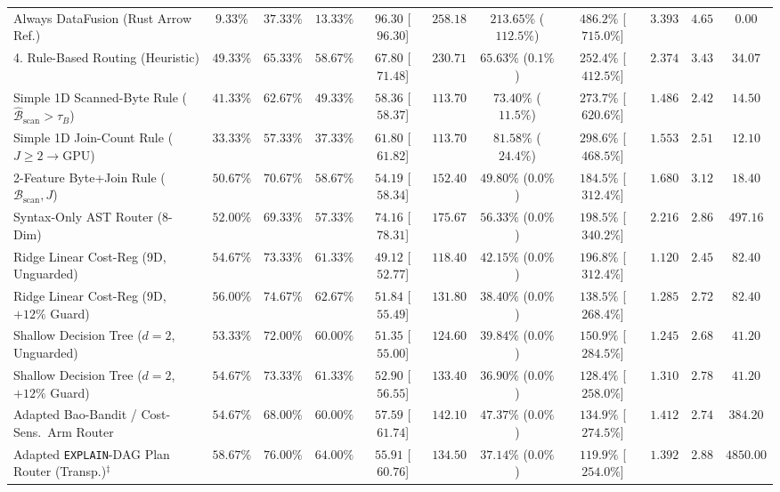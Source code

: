 \documentclass[10pt,a4paper]{article}
\newenvironment{fitasttable}{%
  \begin{lrbox}{\asttblbox}%
}{%
  \end{lrbox}%
  \sbox{\asttblboxB}{%
    \ifdim\wd\asttblbox>0.96\textwidth
      \resizebox{0.96\textwidth}{!}{\usebox{\asttblbox}}%
    \else
      \usebox{\asttblbox}%
    \fi
  }%
  \ifdim\ht\asttblboxB>0.72\textheight
    \resizebox{!}{0.72\textheight}{\usebox{\asttblboxB}}%
  \else
    \usebox{\asttblboxB}%
  \fi
}
\begin{document}
\begin{table}[!htbp]
\begin{fitasttable}
\begin{tabular}{@{}lcccccccccc@{}}
Always DataFusion (Rust Arrow Ref.) & $9.33\%$ & $37.33\%$ & $13.33\%$ & $96.30$ [$96.30$] & $258.18$ & $213.65\%$ ($112.5\%$) & $486.2\%$ [$715.0\%$] & $3.393$ & $4.65$ & $0.00$ \\
4. Rule-Based Routing (Heuristic) & $49.33\%$ & $65.33\%$ & $58.67\%$ & $67.80$ [$71.48$] & $230.71$ & $65.63\%$ ($0.1\%$) & $252.4\%$ [$412.5\%$] & $2.374$ & $3.43$ & $34.07$ \\
Simple 1D Scanned-Byte Rule ($\hat{\mathcal{B}}_{\text{scan}} > \tau_B$) & $41.33\%$ & $62.67\%$ & $49.33\%$ & $58.36$ [$58.37$] & $113.70$ & $73.40\%$ ($11.5\%$) & $273.7\%$ [$620.6\%$] & $1.486$ & $2.42$ & $14.50$ \\
Simple 1D Join-Count Rule ($J \ge 2 \rightarrow \text{GPU}$) & $33.33\%$ & $57.33\%$ & $37.33\%$ & $61.80$ [$61.82$] & $113.70$ & $81.58\%$ ($24.4\%$) & $298.6\%$ [$468.5\%$] & $1.553$ & $2.51$ & $12.10$ \\
2-Feature Byte+Join Rule ($\mathcal{B}_{\text{scan}}, J$) & $50.67\%$ & $70.67\%$ & $58.67\%$ & $54.19$ [$58.34$] & $152.40$ & $49.80\%$ ($0.0\%$) & $184.5\%$ [$312.4\%$] & $1.680$ & $3.12$ & $18.40$ \\
Syntax-Only AST Router (8-Dim) & $52.00\%$ & $69.33\%$ & $57.33\%$ & $74.16$ [$78.31$] & $175.67$ & $56.33\%$ ($0.0\%$) & $198.5\%$ [$340.2\%$] & $2.216$ & $2.86$ & $497.16$ \\
Ridge Linear Cost-Reg (9D, Unguarded) & $54.67\%$ & $73.33\%$ & $61.33\%$ & $49.12$ [$52.77$] & $118.40$ & $42.15\%$ ($0.0\%$) & $196.8\%$ [$312.4\%$] & $1.120$ & $2.45$ & $82.40$ \\
Ridge Linear Cost-Reg (9D, $+12\%$ Guard) & $56.00\%$ & $74.67\%$ & $62.67\%$ & $51.84$ [$55.49$] & $131.80$ & $38.40\%$ ($0.0\%$) & $138.5\%$ [$268.4\%$] & $1.285$ & $2.72$ & $82.40$ \\
Shallow Decision Tree ($d=2$, Unguarded) & $53.33\%$ & $72.00\%$ & $60.00\%$ & $51.35$ [$55.00$] & $124.60$ & $39.84\%$ ($0.0\%$) & $150.9\%$ [$284.5\%$] & $1.245$ & $2.68$ & $41.20$ \\
Shallow Decision Tree ($d=2$, $+12\%$ Guard) & $54.67\%$ & $73.33\%$ & $61.33\%$ & $52.90$ [$56.55$] & $133.40$ & $36.90\%$ ($0.0\%$) & $128.4\%$ [$258.0\%$] & $1.310$ & $2.78$ & $41.20$ \\
Adapted Bao-Bandit / Cost-Sens.\ Arm Router & $54.67\%$ & $68.00\%$ & $60.00\%$ & $57.59$ [$61.74$] & $142.10$ & $47.37\%$ ($0.0\%$) & $134.9\%$ [$274.5\%$] & $1.412$ & $2.74$ & $384.20$ \\
Adapted \texttt{EXPLAIN}-DAG Plan Router (Transp.)$^{\ddagger}$ & $58.67\%$ & $76.00\%$ & $64.00\%$ & $55.91$ [$60.76$] & $134.50$ & $37.14\%$ ($0.0\%$) & $119.9\%$ [$254.0\%$] & $1.392$ & $2.88$ & $4850.00$ \\

\end{tabular}
\end{fitasttable}
\end{table}
\end{document}
